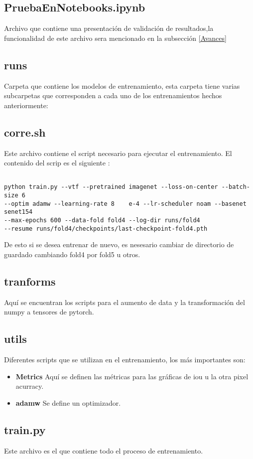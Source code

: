 \subsection{PruebaEnNotebooks.ipynb}
Archivo que contiene una presentación de validación de resultados,la funcionalidad de este archivo sera mencionado en la subsección \ref{Avances}
\subsection{runs}
Carpeta que contiene los modelos de entrenamiento, esta carpeta tiene varias subcarpetas que corresponden a cada uno de los entrenamientos hechos anteriormente:

\subsection{corre.sh}
\label{sub:corre}
Este archivo contiene el script necesario para ejecutar el entrenamiento. El contenido del scrip es el siguiente :
\begin{lstlisting}

python train.py --vtf --pretrained imagenet --loss-on-center --batch-size 6 
--optim adamw --learning-rate 8    e-4 --lr-scheduler noam --basenet senet154 
--max-epochs 600 --data-fold fold4 --log-dir runs/fold4 
--resume runs/fold4/checkpoints/last-checkpoint-fold4.pth
\end{lstlisting}
De esto si se desea entrenar de nuevo, es nesesario cambiar de directorio de guardado cambiando fold4 por fold5 u otros.


\subsection{tranforms}
Aquí se encuentran los scripts para el aumento de data y la transformación del numpy a tensores de pytorch.
\subsection{utils}
Diferentes scripts que se utilizan en el entrenamiento, los más importantes  son:
\begin{itemize}
    \item \textbf{Metrics} Aquí se definen las métricas para las gráficas de iou u la otra pixel acurracy.
    \item \textbf{adamw} Se define un optimizador.
\end{itemize}
\subsection{train.py}
Este archivo es el que contiene todo el proceso de entrenamiento.

